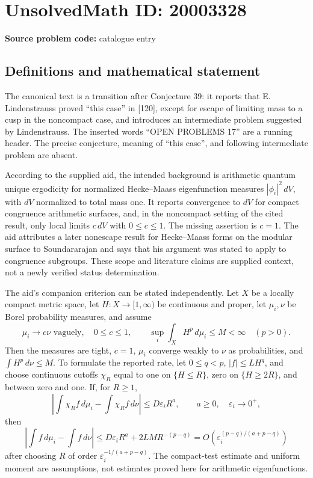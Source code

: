 \documentclass[11pt]{article}
\begin{document}
\section*{UnsolvedMath ID: 20003328}
\textbf{Source problem code:} catalogue entry
\subsection{Definitions and mathematical statement}
The canonical text is a transition after Conjecture 39: it reports that E. Lindenstrauss proved ``this case'' in [120], except for escape of limiting mass to a cusp in the noncompact case, and introduces an intermediate problem suggested by Lindenstrauss. The inserted words ``OPEN PROBLEMS 17'' are a running header. The precise conjecture, meaning of ``this case'', and following intermediate problem are absent.

According to the supplied aid, the intended background is arithmetic quantum unique ergodicity for normalized Hecke--Maass eigenfunction measures $|\phi_i|^2\,dV$, with $dV$ normalized to total mass one. It reports convergence to $dV$ for compact congruence arithmetic surfaces, and, in the noncompact setting of the cited result, only local limits $c\,dV$ with $0\leq c\leq1$. The missing assertion is $c=1$. The aid attributes a later nonescape result for Hecke--Maass forms on the modular surface to Soundararajan and says that his argument was stated to apply to congruence subgroups. These scope and literature claims are supplied context, not a newly verified status determination.

The aid's companion criterion can be stated independently. Let $X$ be a locally compact metric space, let $H:X\to[1,\infty)$ be continuous and proper, let $\mu_i,\nu$ be Borel probability measures, and assume
\[
 \mu_i\longrightarrow c\nu\text{ vaguely},\quad 0\leq c\leq1,
 \qquad \sup_i\int_X H^p\,d\mu_i\leq M<\infty
 \quad(p>0).
\]
Then the measures are tight, $c=1$, $\mu_i$ converge weakly to $\nu$ as probabilities, and $\int H^p\,d\nu\leq M$. To formulate the reported rate, let $0\leq q<p$, $|f|\leq L H^q$, and choose continuous cutoffs $\chi_R$ equal to one on $\{H\leq R\}$, zero on $\{H\geq2R\}$, and between zero and one. If, for $R\geq1$,
\[
 \left|\int\chi_R f\,d\mu_i-\int\chi_R f\,d\nu\right|
 \leq D\varepsilon_i R^a,\qquad
 a\geq0,\quad \varepsilon_i\to0^+,
\]
then
\[
 \left|\int f\,d\mu_i-\int f\,d\nu\right|
 \leq D\varepsilon_i R^a+2LMR^{-(p-q)}
 =O\!\left(\varepsilon_i^{(p-q)/(a+p-q)}\right)
\]
after choosing $R$ of order $\varepsilon_i^{-1/(a+p-q)}$. The compact-test estimate and uniform moment are assumptions, not estimates proved here for arithmetic eigenfunctions.
\end{document}
